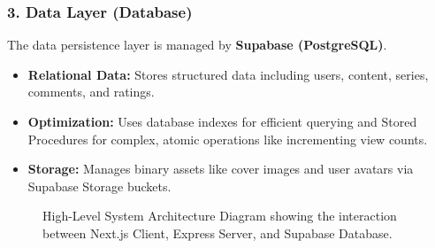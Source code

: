 \subsubsection*{3. Data Layer (Database)}
The data persistence layer is managed by \textbf{Supabase (PostgreSQL)}.
\begin{itemize}
    \item \textbf{Relational Data:} Stores structured data including users, content, series, comments, and ratings.
    \item \textbf{Optimization:} Uses database indexes for efficient querying and Stored Procedures for complex, atomic operations like incrementing view counts.
    \item \textbf{Storage:} Manages binary assets like cover images and user avatars via Supabase Storage buckets.
\end{itemize}

\begin{figure}[h]
    \centering
    \caption{High-Level System Architecture Diagram showing the interaction between Next.js Client, Express Server, and Supabase Database.}
    \label{fig:architecture}
\end{figure}
